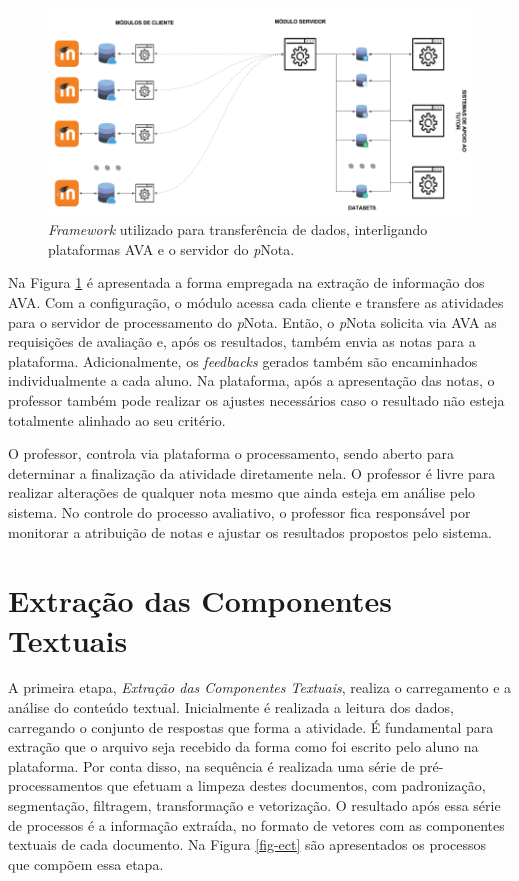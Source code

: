 \begin{figure}[!h]
\centering
\includegraphics[width=\textwidth]{figuras/framework-moodle.png}
\caption{\textit{Framework} utilizado para transferência de dados, interligando plataformas AVA e o servidor do \textit{p}Nota.}
\label{fig-framework}
\end{figure}

Na Figura \ref{fig-framework} é apresentada a forma empregada na extração de informação dos AVA. Com a configuração, o módulo acessa cada cliente e transfere as atividades para o servidor de processamento do \textit{p}Nota. Então, o \textit{p}Nota solicita via AVA as requisições de avaliação e, após os resultados, também envia as notas para a plataforma. Adicionalmente, os \textit{feedbacks} gerados também são encaminhados individualmente a cada aluno. Na plataforma, após a apresentação das notas, o professor também pode realizar os ajustes necessários caso o resultado não esteja totalmente alinhado ao seu critério.

O professor, controla via plataforma o processamento, sendo aberto para determinar a finalização da atividade diretamente nela. O professor é livre para realizar alterações de qualquer nota mesmo que ainda esteja em análise pelo sistema. No controle do processo avaliativo, o professor fica responsável por monitorar a atribuição de notas e ajustar os resultados propostos pelo sistema.


\section{Extração das Componentes Textuais}
\label{sec-componentes-textuais}

A primeira etapa, \textit{Extração das Componentes Textuais}, realiza o carregamento e a análise do conteúdo textual. Inicialmente é realizada a leitura dos dados, carregando o conjunto de respostas que forma a atividade. É fundamental para extração que o arquivo seja recebido da forma como foi escrito pelo aluno na plataforma. Por conta disso, na sequência é realizada uma série de pré-processamentos que efetuam a limpeza destes documentos, com padronização, segmentação, filtragem, transformação e vetorização. O resultado após essa série de processos é a informação extraída, no formato de vetores com as componentes textuais de cada documento. Na Figura \ref{fig-ect} são apresentados os processos que compõem essa etapa.

